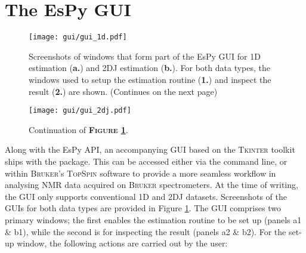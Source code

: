 \section{The \acs{EsPy} \acs{GUI}}
\begin{figure}
    \centering
    \texttt{[image: gui/gui\_1d.pdf]}
    \caption[
        Screenshots of the \acs{EsPy} \acs{GUI} for \ac{1D} and \acs{2DJ} estimation.
    ]{
        Screenshots of windows that form part of the \ac{EsPy} \ac{GUI} for
        \ac{1D} estimation (\textbf{a.}) and \ac{2DJ} estimation (\textbf{b.}).
        For both data types, the windows used to setup the estimation routine
        (\textbf{1.}) and inspect the result (\textbf{2.}) are shown.
        (Continues on the next page)
    }
    \label{fig:gui}
\end{figure}
\begin{figure}%
    \ContinuedFloat
    \centering
    \texttt{[image: gui/gui\_2dj.pdf]}
    \caption*{Continuation of \textbf{\textsc{Figure \ref{fig:gui}}}.}
\end{figure}
Along with the \ac{EsPy} \ac{API}, an accompanying \ac{GUI} based on the
\textsc{Tkinter} toolkit ships with the
package. This can be accessed either via the command line, or within
\textsc{Bruker}'s \textsc{TopSpin} software to provide a more seamless workflow
in analysing \ac{NMR} data acquired on \textsc{Bruker} spectrometers.
At the time of writing, the \ac{GUI} only supports conventional \ac{1D}
and \ac{2DJ} datasets. Screenshots of the \acp{GUI} for both data types are
provided in Figure \ref{fig:gui}.
The \ac{GUI} comprises two primary windows; the first enables the estimation
routine to be set up (panels a1 \& b1), while the second is for inspecting the
result (panels a2 \& b2). For the set-up window, the following actions are
carried out by the user:
